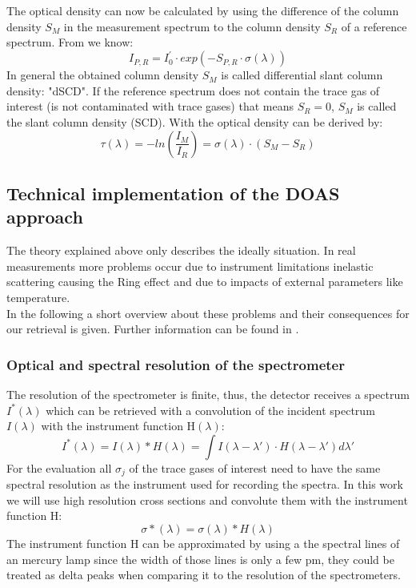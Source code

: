 \documentclass  [
  paper    = a4,
  BCOR     = 10mm,
  twoside,
  fontsize = 12pt,
  fleqn,
  toc      = bibnumbered,
  toc      = listofnumbered,
  numbers  = noendperiod,
  headings = normal,
  listof   = leveldown,
  version  = 3.03
]                                       {scrreprt}
\begin{document}
	The optical density can now be calculated by using the difference of the column density $S_{M}$ in the measurement spectrum to the column density $S_{R}$ of a reference spectrum. From  we know:	
	\begin{equation}
	I_{P,R} = I^{'}_{0}\cdot exp\left(-S_{P,R}\cdot\sigma\left(\lambda\right)\right)
	\label{eq:smr}
	\end{equation}
	In general the obtained column density $S_{M}$ is called differential slant column density: "dSCD". If the reference spectrum does not contain the trace gas of interest (is not contaminated with trace gases) that means $S_{R} = 0$, $S_{M}$ is called the slant column	density (SCD). 
	With  the optical density can be derived by:
	\begin{equation}
	\tau\left(\lambda\right) = -ln\left(\frac{I_{M}}{I_{R}}\right) = \sigma\left(\lambda\right)\cdot\left(S_{M}-S_{R}\right)
	\end{equation}

	
	
	\subsection{Technical implementation of the DOAS approach}
	The theory explained above only describes the ideally situation. In real measurements more problems occur due to instrument limitations inelastic scattering causing the Ring effect and due to impacts of external parameters like temperature.\\
	In the following a short overview about these problems and their consequences for our retrieval is given. Further information can be found in \cite{lubcke2014optical}.\\
	\subsubsection*{Optical and spectral resolution of the spectrometer}
	The resolution of the spectrometer is finite, thus, the detector receives a spectrum $I^{*}\left(\lambda\right)$ which can be retrieved with a convolution of the incident spectrum $I\left(\lambda\right)$ with the instrument function H$\left(\lambda\right)$:
	\begin{equation}
	I^{*}\left(\lambda\right) = I\left(\lambda\right)*H\left(\lambda\right)=\int I\left(\lambda-\lambda{'}\right)\cdot H\left(\lambda-\lambda{'}\right)d\lambda{'}
	\end{equation} 
	For the evaluation all $\sigma_{j}$  of the trace gases of interest need to have the same spectral resolution as the instrument used for recording the spectra. In this work we will use high resolution cross sections and convolute them with the instrument function H:
	\begin{equation}
	\sigma{*}\left(\lambda\right) = \sigma\left(\lambda\right)*H\left(\lambda\right)
	\end{equation}
	The instrument function H can be approximated by using a the spectral lines of an mercury lamp since the width of those lines is only a few pm, they could be treated as delta peaks when comparing it to the resolution of the spectrometers.
	
\end{document}
